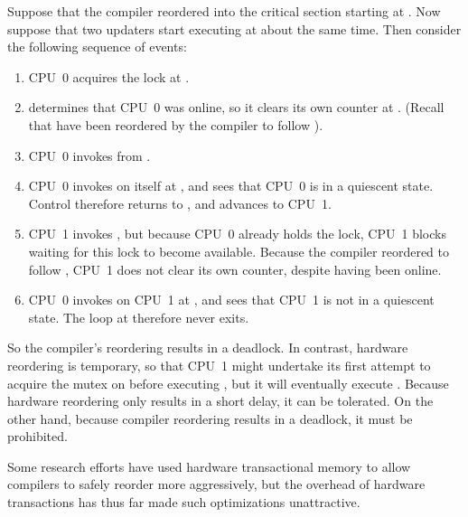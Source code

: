 {\begin{fcvref}
	Suppose that the compiler reordered  into
	the critical section starting at .
	Now suppose that two updaters start executing 
	at about the same time.
	Then consider the following sequence of events:
	\begin{enumerate}
	\item	CPU~0 acquires the lock at .
	\item	{} determines that CPU~0 was online, so it clears
		its own counter at .
		(Recall that  have been reordered by the
		compiler to follow ).
	\item	CPU~0 invokes  from
		.
	\item	CPU~0 invokes  on itself at
		, and  sees that CPU~0 is
		in a quiescent state.
		Control therefore returns to ,
		and  advances to CPU~1.
	\item	CPU~1 invokes , but because CPU~0
		already holds the lock, CPU~1 blocks waiting for this
		lock to become available.
		Because the compiler reordered  to follow
		, CPU~1 does not clear its own counter,
		despite having been online.
	\item	CPU~0 invokes  on CPU~1 at
		, and  sees that CPU~1 is
		not in a quiescent state.
		The  loop at  therefore never
		exits.
	\end{enumerate}

	So the compiler's reordering results in a deadlock.
	In contrast, hardware reordering is temporary, so that CPU~1
	might undertake its first attempt to acquire the mutex on
	 before executing , but it
	will eventually execute .
	Because hardware reordering only results in a short delay, it
	can be tolerated.
	On the other hand, because compiler reordering results in a
	deadlock, it must be prohibited.

	Some research efforts have used hardware transactional memory
	to allow compilers to safely reorder more aggressively, but
	the overhead of hardware transactions has thus far made
	such optimizations unattractive.
\end{fcvref}
}\QuickQuizEnd

